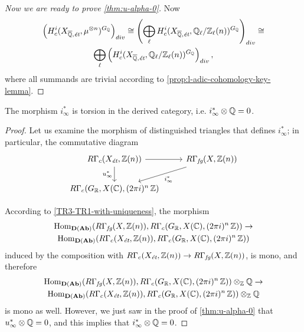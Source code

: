 \begin{proof}[Now we are ready to prove \ref{thm:u-alpha-0}]
  Now
  \begin{multline*}
    \left(H^i_c (X_{\overline{\mathbb{Q}}, \text{\it ét}}, \mu^{\otimes n})^{G_{\mathbb{Q}}}\right)_{div} \cong
    \left(\bigoplus_\ell H^i_c (X_{\overline{\mathbb{Q}}, \text{\it ét}}, \mathbb{Q}_\ell/\mathbb{Z}_\ell (n))^{G_{\mathbb{Q}}}\right)_{div} \cong\\
    \bigoplus_\ell \left(H^i_c (X_{\overline{\mathbb{Q}}, \text{\it ét}}, \mathbb{Q}_\ell/\mathbb{Z}_\ell (n))^{G_{\mathbb{Q}}}\right)_{div},
  \end{multline*}
  where all summands are trivial according to
  \ref{prop:l-adic-cohomology-key-lemma}.
\end{proof}

\begin{corollary}
  \label{i-infty-is-torsion}
  The morphism $i_\infty^*$ is torsion in the derived category,
  i.e. $i_\infty^*\otimes \mathbb{Q} = 0$.

  \begin{proof}
    Let us examine the morphism of distinguished triangles
     that defines $i_\infty^*$;
    in particular, the commutative diagram
    \[ \begin{tikzcd}
        R\Gamma_c (X_\text{\it ét}, \ZZ (n)) \ar{r}\ar{d}[swap]{u_\infty^*} &
        R\Gamma_\text{\it fg} (X, \ZZ (n))\ar{dl}{i_\infty^*} \\
        R\Gamma_c (G_\RR, X (\CC), (2\pi i)^n \, \ZZ)
      \end{tikzcd} \]

    According to \ref{TR3-TR1-with-uniqueness}, the morphism
    \begin{multline*}
      \operatorname{Hom}_{\text{\bf D} (\text{\bf Ab})} (R\Gamma_\text{\it fg} (X,\mathbb{Z} (n)), R\Gamma_c (G_{\mathbb{R}}, X (\mathbb{C}), (2\pi i)^n\,\mathbb{Z})) \to\\
      \operatorname{Hom}_{\text{\bf D} (\text{\bf Ab})} (R\Gamma_c (X_\text{\it ét}, \mathbb{Z} (n)), R\Gamma_c (G_{\mathbb{R}}, X (\mathbb{C}), (2\pi i)^n\,\mathbb{Z}))
    \end{multline*}
    induced by the composition with
    $R\Gamma_c (X_\text{\it ét}, \mathbb{Z} (n)) \to R\Gamma_\text{\it fg} (X,\mathbb{Z} (n))$,
    is mono, and therefore
    \begin{multline*}
      \operatorname{Hom}_{\text{\bf D} (\text{\bf Ab})} (R\Gamma_\text{\it fg} (X,\mathbb{Z} (n)), R\Gamma_c (G_{\mathbb{R}}, X (\mathbb{C}), (2\pi i)^n\,\mathbb{Z}))\otimes_{\mathbb{Z}} \mathbb{Q} \to\\
      \operatorname{Hom}_{\text{\bf D} (\text{\bf Ab})} (R\Gamma_c (X_\text{\it ét}, \mathbb{Z} (n)), R\Gamma_c (G_{\mathbb{R}}, X (\mathbb{C}), (2\pi i)^n\,\mathbb{Z}))\otimes_{\mathbb{Z}} \mathbb{Q}
    \end{multline*}
    is mono as well. However, we just saw in the proof of \ref{thm:u-alpha-0}
    that $u_\infty^*\otimes \mathbb{Q} = 0$, and this implies that
    $i_\infty^*\otimes \mathbb{Q} = 0$.
  \end{proof}
\end{corollary}


